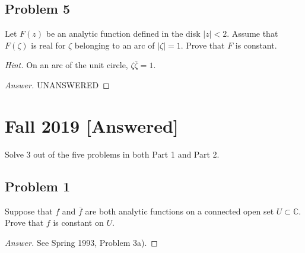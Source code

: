 \documentclass[12pt]{article}
\newcommand{\cx}{\mathbb{C}}
\newcommand{\ita}[1]{\textit{#1}}
\newcommand{\abs}[1]{\left| #1 \right|}
\theoremstyle{definition}
\begin{document}
\subsection{Problem 5}
Let $F(z)$ be an analytic function defined in the disk $|z| < 2$. Assume that $F(\zeta)$ is real for $\zeta$ belonging to an arc of $\abs{ \zeta } = 1$. Prove that $F$ is constant. 

\noindent \ita{Hint.} On an arc of the unit circle, $\zeta \overline{\zeta} = 1$. 

\begin{proof}[Answer]
    UNANSWERED
\end{proof}

\newpage
\section{Fall 2019 [Answered]}
Solve 3 out of the five problems in both Part 1 and Part 2.

\subsection{Problem 1}
Suppose that $f$ and $\bar{f}$ are both analytic functions on a connected open set $U \subset \cx$. Prove that $f$ is constant on $U$. 
\begin{proof}[Answer]
    See Spring 1993, Problem 3a). 
\end{proof}
\end{document}
